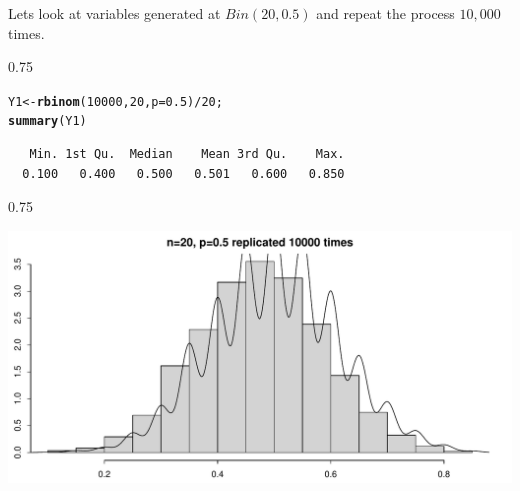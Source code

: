 \documentclass{beamer}\usepackage[]{graphicx}\usepackage[]{color}
\makeatletter
\newcommand{\hlnum}[1]{\textcolor[rgb]{0.2,0.2,0.2}{#1}}%
\newcommand{\hlopt}[1]{\textcolor[rgb]{0.102,0.102,0.102}{#1}}%
\newcommand{\hlstd}[1]{\textcolor[rgb]{0.102,0.102,0.102}{#1}}%
\newcommand{\hlkwb}[1]{\textcolor[rgb]{0.102,0.102,0.102}{#1}}%
\newcommand{\hlkwc}[1]{\textcolor[rgb]{0.2,0.2,0.2}{#1}}%
\newcommand{\hlkwd}[1]{\textcolor[rgb]{0.102,0.102,0.102}{\textbf{#1}}}%
\newenvironment{kframe}{%
 \def\at@end@of@kframe{}%
 \ifinner\ifhmode%
  \def\at@end@of@kframe{\end{minipage}}%
  \begin{minipage}{\columnwidth}%
 \fi\fi%
 \def\FrameCommand##1{\hskip\@totalleftmargin \hskip-\fboxsep
 \colorbox{shadecolor}{##1}\hskip-\fboxsep
     \hskip-\linewidth \hskip-\@totalleftmargin \hskip\columnwidth}%
 \MakeFramed {\advance\hsize-\width
   \@totalleftmargin\z@ \linewidth\hsize
   \@setminipage}}%
 {\par\unskip\endMakeFramed%
 \at@end@of@kframe}
\newenvironment{knitrout}{}{} %
\renewenvironment{knitrout}{\begin{spacing}{0.75}\begin{tiny}}{\end{tiny}\end{spacing}}
\makeatother
\begin{document}
\begin{frame}[fragile]

Lets look at variables generated at $Bin(20,0.5)$ and repeat the process $10,000$ times.

\begin{knitrout}\small
{}\color{fgcolor}\begin{kframe}
\begin{alltt}
\hlstd{Y1} \hlkwb{<-} \hlkwd{rbinom}\hlstd{(}\hlnum{10000}\hlstd{,} \hlnum{20}\hlstd{,} \hlkwc{p}\hlstd{=}\hlnum{0.5}\hlstd{)}\hlopt{/} \hlnum{20}\hlstd{;}
\hlkwd{summary}\hlstd{(Y1)}
\end{alltt}
\begin{verbatim}
   Min. 1st Qu.  Median    Mean 3rd Qu.    Max. 
  0.100   0.400   0.500   0.501   0.600   0.850 
\end{verbatim}
\end{kframe}
\end{knitrout}

\end{frame}

\begin{frame}[fragile]

\begin{knitrout}\small
{}\color{fgcolor}

{\centering \includegraphics[width=0.89\linewidth]{figure/graphics-unnamed-chunk-2-1} 

}



\end{knitrout}

\end{frame}
\end{document}
